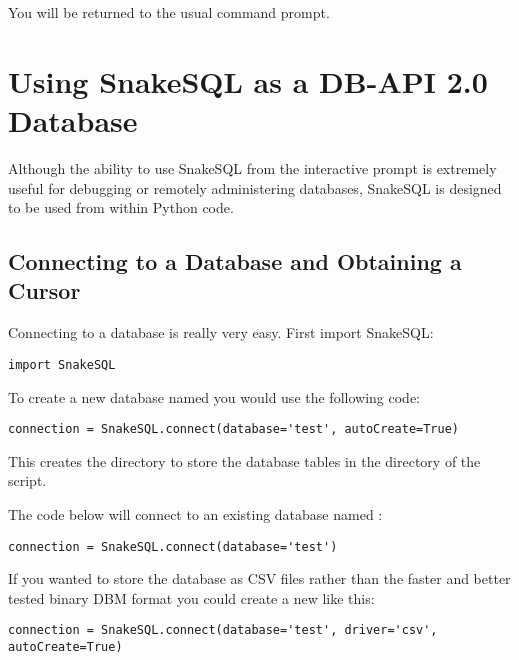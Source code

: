 \documentclass{howto}
\begin{document}
You will be returned to the usual command prompt.

\section{Using SnakeSQL as a DB-API 2.0 Database}

Although the ability to use SnakeSQL from the interactive prompt is extremely useful for debugging or remotely administering databases, SnakeSQL is designed to be used from within Python code.

\subsection{Connecting to a Database and Obtaining a Cursor}

Connecting to a database is really very easy. First import SnakeSQL:

\begin{verbatim}
import SnakeSQL
\end{verbatim}

To create a new database named  you would use the following code:

\begin{verbatim}
connection = SnakeSQL.connect(database='test', autoCreate=True)
\end{verbatim}

This creates the directory  to store the database tables in the directory of the script.

The code below will connect to an existing database named :

\begin{verbatim}
connection = SnakeSQL.connect(database='test')
\end{verbatim}

If you wanted to store the database as CSV files rather than the faster and better tested binary DBM format you could create a new like this:

\begin{verbatim}
connection = SnakeSQL.connect(database='test', driver='csv', autoCreate=True)
\end{verbatim}

\end{document}
